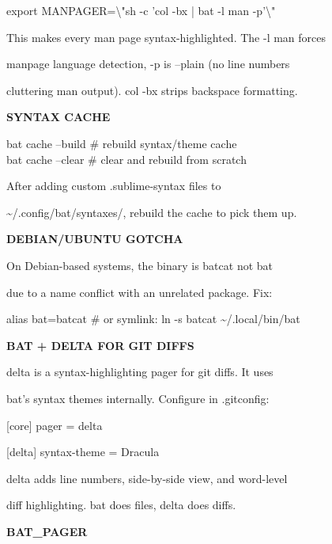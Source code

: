 \documentclass[11pt,a4paper,twoside]{book}
\begin{document}
\begin{codebox}
export MANPAGER=\textbackslash{}"sh -c 'col -bx | bat -l man -p'\textbackslash{}"\\
\end{codebox}

This makes every man page syntax-highlighted. The -l man forces

manpage language detection, -p is --plain (no line numbers

cluttering man output). col -bx strips backspace formatting.


\vspace{12pt}
{\bfseries\color{neonyellow} SYNTAX CACHE}\vspace{4pt}

\begin{codebox}
bat cache --build    \# rebuild syntax/theme cache\\
bat cache --clear    \# clear and rebuild from scratch\\
\end{codebox}

After adding custom .sublime-syntax files to

\textasciitilde{}/.config/bat/syntaxes/, rebuild the cache to pick them up.


\vspace{12pt}
{\bfseries\color{neonyellow} DEBIAN/UBUNTU GOTCHA}\vspace{4pt}

On Debian-based systems, the binary is batcat not bat

due to a name conflict with an unrelated package. Fix:

alias bat=batcat     \# or symlink: ln -s batcat \textasciitilde{}/.local/bin/bat


\vspace{12pt}
{\bfseries\color{neonyellow} BAT + DELTA FOR GIT DIFFS}\vspace{4pt}

delta is a syntax-highlighting pager for git diffs. It uses

bat's syntax themes internally. Configure in .gitconfig:

[core] pager = delta

[delta] syntax-theme = Dracula

delta adds line numbers, side-by-side view, and word-level

diff highlighting. bat does files, delta does diffs.


\vspace{12pt}
{\bfseries\color{neonyellow} BAT\_PAGER}\vspace{4pt}
\end{document}
